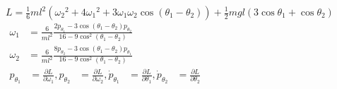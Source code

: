 \documentclass[portrait,a0b,final,a4resizeable]{a0poster}
\def\jointspacing{\vspace{0.3in}}
\begin{document}
\begin{poster}
\begin{multicols}{2}
      \centering
      ${\displaystyle L={\tfrac {1}{6}}ml^{2}\left({{\omega}_{2}}^{2}+4{{\omega}_{1}}^{2}+3{{\omega}_{1}}{{\omega}_{2}}\cos(\theta _{1}-\theta _{2})\right)+{\tfrac {1}{2}}mgl\left(3\cos \theta _{1}+\cos \theta _{2}\right)}$
      ${\displaystyle {\begin{aligned}{{\omega}_{1}}&={\frac {6}{ml^{2}}}{\frac {2p_{\theta _{1}}-3\cos(\theta _{1}-\theta _{2})p_{\theta _{2}}}{16-9\cos ^{2}(\theta _{1}-\theta _{2})}}\\{{\omega}_{2}}&={\frac {6}{ml^{2}}}{\frac {8p_{\theta _{2}}-3\cos(\theta _{1}-\theta _{2})p_{\theta _{1}}}{16-9\cos ^{2}(\theta _{1}-\theta _{2})}}\end{aligned}}}$\\
      ${\displaystyle {\begin{aligned}{{{p}}_{\theta _{1}}}&={\frac {\partial L}{\partial \omega _{1}}}, {{{p}}_{\theta_{2}}}&={\frac {\partial L}{\partial \omega_{2}}}, {{\dot {p}}_{\theta _{1}}}&={\frac {\partial L}{\partial \theta _{1}}}, {{\dot {p}}_{\theta _{2}}}&={\frac {\partial L}{\partial \theta _{2}}}\end{aligned}}}$\\
      \null\hspace*{2cm}\begin{minipage}[c]{0.80\columnwidth}\center{}
      \end{minipage}

      \jointspacing



\end{multicols}
\end{poster}
\end{document}
